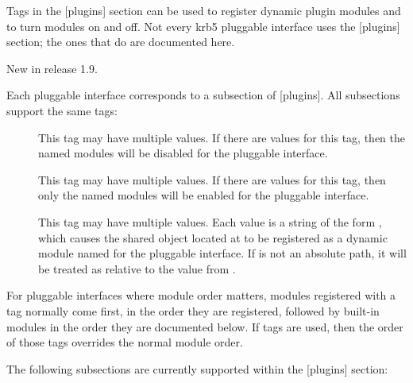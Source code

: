 \documentclass[letterpaper,10pt,english]{sphinxmanual}
\begin{document}
Tags in the {[}plugins{]} section can be used to register dynamic plugin
modules and to turn modules on and off.  Not every krb5 pluggable
interface uses the {[}plugins{]} section; the ones that do are documented
here.

New in release 1.9.

Each pluggable interface corresponds to a subsection of {[}plugins{]}.
All subsections support the same tags:
\begin{description}
\item[{}] \leavevmode
This tag may have multiple values. If there are values for this
tag, then the named modules will be disabled for the pluggable
interface.

\item[{}] \leavevmode
This tag may have multiple values. If there are values for this
tag, then only the named modules will be enabled for the pluggable
interface.

\item[{}] \leavevmode
This tag may have multiple values.  Each value is a string of the
form , which causes the shared object
located at  to be registered as a dynamic module named
 for the pluggable interface.  If  is not an
absolute path, it will be treated as relative to the
 value from {\hyperref[\detokenize{admin/conf_files/krb5_conf:libdefaults}]{}}.

\end{description}

For pluggable interfaces where module order matters, modules
registered with a  tag normally come first, in the order
they are registered, followed by built-in modules in the order they
are documented below.  If  tags are used, then the
order of those tags overrides the normal module order.

The following subsections are currently supported within the {[}plugins{]}
section:
\end{document}
